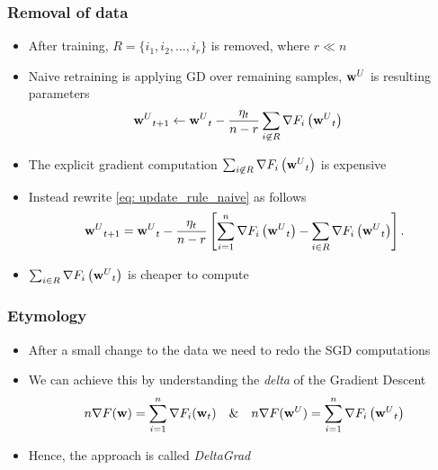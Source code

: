 \documentclass[pdf]{beamer}
\begin{document}
\begin{frame}
  \frametitle{Removal of data}
  \begin{itemize}
    \item After training,  $R = \{i_1,i_2,\dots,i_r\}$ is removed, where $r \ll n$
    \item Naive retraining is applying GD over remaining samples, $\textbf{w}^{U}$ is resulting parameters
    \begin{align}\label{eq: update_rule_naive} 
      & {\textbf{w}^{U}}_{t+1} \leftarrow {\textbf{w}^{U}}_{t} - \frac{\eta_t}{n-r}\sum_{\substack{i \not\in R}} \nabla F_i\left({\textbf{w}^{U}}_{t}\right) 
    \end{align}
    \item The explicit gradient computation $\sum_{\substack{i \not\in R}} \nabla F_i\left({\textbf{w}^{U}}_{t}\right)$ is expensive
    \item Instead rewrite \eqref{eq: update_rule_naive} as follows 
    \begin{align}\label{eq: approx_w_t}
      \begin{split}
      {\textbf{w}^{U}}_{t+1} 
               = {\textbf{w}^{U}}_{t} - \frac{\eta_t}{n-r}\left[\sum_{i=1}^{n} \nabla F_{i}\left({\textbf{w}^{U}}_{t}\right) - \sum_{\substack{i \in R}} \nabla F_i\left({\textbf{w}^{U}}_{t}\right)\right].
      \end{split}
      \end{align}
      \item $\sum_{\substack{i \in R}} \nabla F_i\left({\textbf{w}^{U}}_{t}\right)$ is cheaper to compute
  \end{itemize}
\end{frame}

\begin{frame}
  \frametitle{Etymology}
  \begin{itemize}
    \item After a small change to the data we need to redo the SGD computations
    \item We can achieve this by understanding the \textit{delta} of the Gradient Descent 
    \[ 
      n\nabla F(\textbf{w}) = \sum_{i=1}^{n}\nabla F_{i}(\textbf{w}_t) \quad \& \quad n\nabla F({\textbf{w}^{U}}) =  \sum_{i=1}^{n} \nabla F_{i}\left({\textbf{w}^{U}}_{t}\right)
    \]
    \item Hence, the approach is called \textit{DeltaGrad}
  \end{itemize}
\end{frame}
\end{document}
